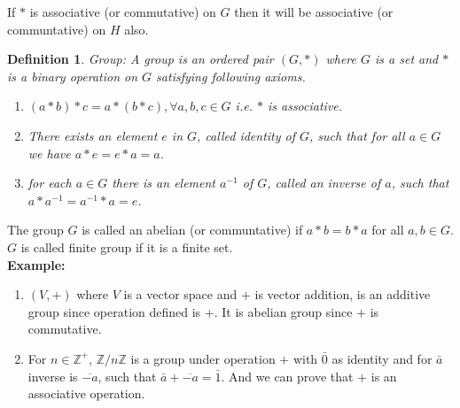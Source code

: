 \documentclass[12pt]{report}
\newtheorem{defn}{Definition}
\begin{document}
If $*$ is associative (or commutative) on $G$ then it will be associative (or communtative) on $H$ also.
\begin{defn}
    Group: A group is an ordered pair $(G, *)$ where $G$ is a set and $*$ is a binary operation on $G$ satisfying following axioms.
    \begin{enumerate}
        \item $(a*b)*c = a*(b*c), \forall a,b,c \in G$ i.e. $*$ is associative.
        \item There exists an element $e$ in $G$, called identity of $G$, such that for all $a \in G$ we have $a*e = e*a = a$.
        \item for each $a \in G$ there is an element $a^{-1}$ of $G$, called an inverse of $a$, such that $a * a^{-1} = a^{-1} * a = e$.
    \end{enumerate}
\end{defn}
The group $G$ is called an abelian (or communtative) if $a*b = b*a$ for all $a,b \in G$.
$G$ is called finite group if it is a finite set.\\
\textbf{Example: }
\begin{enumerate}
    \item $(V, +)$ where $V$ is a vector space and $+$ is vector addition, is an additive group since operation defined is $+$. It is abelian group since $+$ is commutative.
    \item For $n \in \mathbb{Z}^+$, $\mathbb{Z}/n\mathbb{Z}$ is a group under operation $+$ with $\bar{0}$ as identity and for $\bar{a}$ inverse is $\overline{-a}$, such that $\bar{a} + \overline{-a} = \bar{1}$. And we can prove that $+$ is an associative operation.
\end{enumerate}
\end{document}
